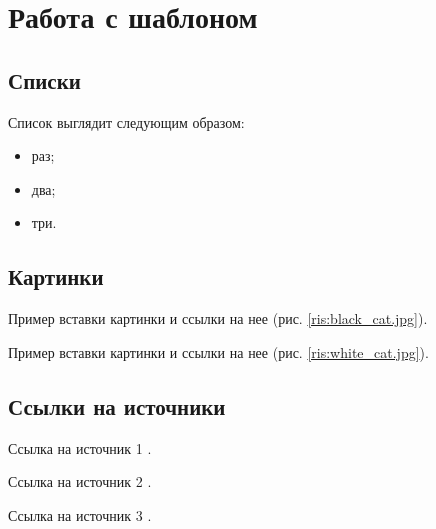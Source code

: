 \section{Работа с шаблоном}
\subsection{Списки}
Список выглядит следующим образом:
\begin{itemize}
\item раз;
\item два;
\item три.
\end{itemize}

\subsection{Картинки}
Пример вставки картинки и ссылки на нее (рис. \ref{ris:black_cat.jpg}).


Пример вставки картинки и ссылки на нее (рис. \ref{ris:white_cat.jpg}).


\subsection{Ссылки на источники}
Ссылка на источник 1 \cite{src1}.

Ссылка на источник 2 \cite{src2}.

Ссылка на источник 3 \cite{src3}.